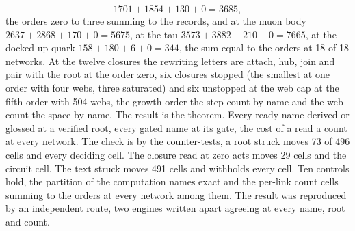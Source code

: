\begin{chproof}
\begin{equation}
1701 + 1854 + 130 + 0 = 3685 ,
\end{equation}
the orders zero to three summing to the records, and at the muon body $2637 + 2868 + 170 + 0 = 5675$, at the tau $3573 + 3882 + 210 + 0 = 7665$, at the docked up quark $158 + 180 + 6 + 0 = 344$, the sum equal to the orders at 18 of 18 networks. At the twelve closures the rewriting letters are attach, hub, join and pair with the root at the order zero, six closures stopped (the smallest at one order with four webs, three saturated) and six unstopped at the web cap at the fifth order with 504 webs, the growth order the step count by name and the web count the space by name. The result is the theorem. Every ready name derived or glossed at a verified root, every gated name at its gate, the cost of a read a count at every network.
The check is by the counter-tests, a root struck moves 73 of 496 cells and every deciding cell. The closure read at zero acts moves 29 cells and the circuit cell. The text struck moves 491 cells and withholds every cell. Ten controls hold, the partition of the computation names exact and the per-link count cells summing to the orders at every network among them.
The result was reproduced by an independent route, two engines written apart agreeing at every name, root and count.
\end{chproof}

\par\medskip{}\label{narr:close:13-1}\par
